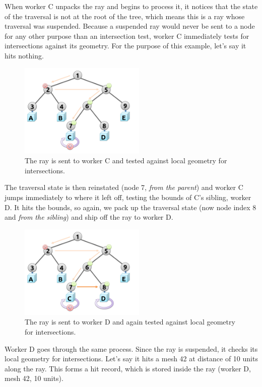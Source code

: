 \documentclass[a4paper,twoside]{article}
\begin{document}
When worker C unpacks the ray and begins to process it, it notices that the
state of the traversal is not at the root of the tree, which means this is a
ray whose traversal was suspended. Because a suspended ray would never be sent
to a node for any other purpose than an intersection test, worker C immediately
tests for intersections against its geometry. For the purpose of this example,
let's say it hits nothing.

\begin{figure}[h!]
    \centering
    \includegraphics[width=60mm]{figures/traversal4.pdf}
    \caption{The ray is sent to worker C and tested against local geometry for intersections.}
    \label{fig:traversal4}
\end{figure}

The traversal state is then reinstated (node 7, \emph{from the parent}) and
worker C jumps immediately to where it left off, testing the bounds of C's
sibling, worker D. It hits the bounds, so again, we pack up the traversal
state (now node index 8 and \emph{from the sibling}) and ship off the ray to
worker D.

\begin{figure}[h!]
    \centering
    \includegraphics[width=60mm]{figures/traversal5.pdf}
    \caption{The ray is sent to worker D and again tested against local geometry for intersections.}
    \label{fig:traversal5}
\end{figure}

Worker D goes through the same process. Since the ray is suspended, it checks
its local geometry for intersections. Let's say it hits a mesh 42 at distance
of 10 units along the ray. This forms a hit record, which is stored inside the
ray (worker D, mesh 42, 10 units).
\end{document}
